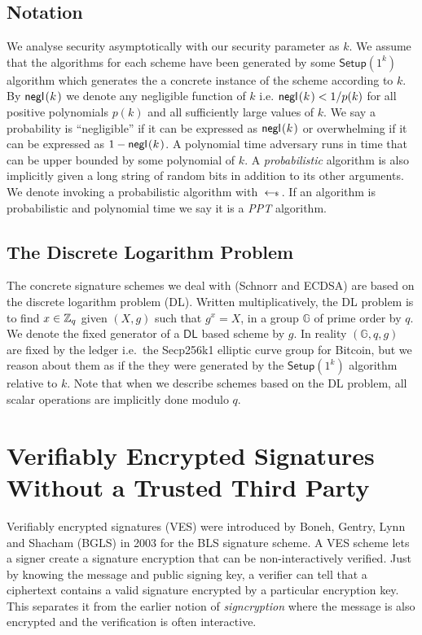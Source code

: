 \documentclass[fullpage]{article}
\theoremstyle{definition}
\newcommand{\G}{\mathbb{G}}
\newcommand{\DLOG}{\textsf{DL}\xspace}
\begin{document}
\subsection{Notation}
We analyse security asymptotically with our security parameter as $k$. We assume that the algorithms for each scheme have been generated by some $\textsf{Setup}(1^k)$ algorithm which generates the a concrete instance of the scheme according to $k$. By $\negl[k]$ we denote any negligible function of $k$ i.e.  $\negl[k] < 1/p(k)$  for all positive polynomials $p(k)$ and all sufficiently large values of $k$. We say a probability is ``negligible'' if it can be expressed as $\negl[k]$ or overwhelming if it can be expressed as $1 - \negl[k]$.  A polynomial time adversary runs in time that can be upper bounded by some polynomial of $k$. A \emph{probabilistic} algorithm is also implicitly given a long string of random bits in addition to its other arguments. We denote invoking a probabilistic algorithm with $\hskip2.3pt{\gets\!\!\mbox{\tiny${\$}$\normalsize}}\,$. If an algorithm is probabilistic and polynomial time we say it is a \emph{PPT} algorithm.

\subsection{The Discrete Logarithm Problem}

The concrete signature schemes we deal with (Schnorr and ECDSA) are based on the discrete logarithm problem (\DLOG). Written multiplicatively, the \DLOG problem is to find $x \in \mathbb{Z}_q$ given $(X,g)$ such that $g^x = X$, in a group $\G$ of prime order by $q$. We denote the fixed generator of a $\DLOG$ based scheme by $g$. In reality $(\G,q,g)$ are fixed by the ledger i.e.\ the Secp256k1 elliptic curve group for Bitcoin, but we reason about them as if the they were generated by the $\textsf{Setup}(1^k)$ algorithm relative to $k$. Note that when we describe schemes based on the \DLOG problem, all scalar operations are implicitly done modulo $q$.

\section{Verifiably Encrypted Signatures Without a Trusted Third Party}
\label{VES-section}

Verifiably encrypted signatures (VES) were introduced by Boneh, Gentry, Lynn and Shacham (BGLS) \cite{Boneh:2003:AVE:1766171.1766207} in 2003 for the BLS signature scheme\cite{Boneh:2001:SSW:647097.717005}. A VES scheme lets a signer create a signature encryption that can be non-interactively verified. Just by knowing the message and public signing key, a verifier can tell that a ciphertext contains a valid signature encrypted by a particular encryption key. This separates it from the earlier notion of \emph{signcryption}\cite{signcryption-book} where the message is also encrypted and the verification is often interactive.
\end{document}
